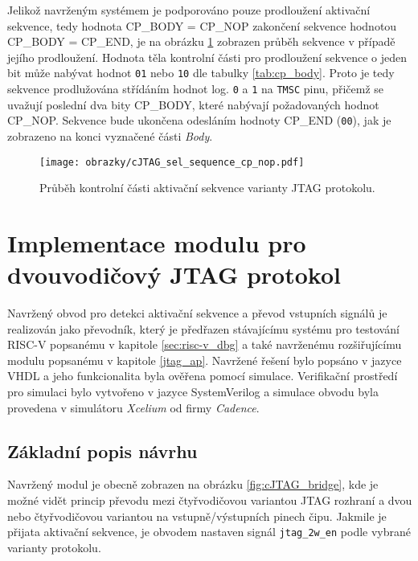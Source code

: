Jelikož navrženým systémem je podporováno pouze prodloužení aktivační sekvence, tedy hodnota CP\_BODY = CP\_NOP zakončení sekvence hodnotou \\CP\_BODY = CP\_END, je na obrázku \ref{fig:cJTAG_sel_cp_nop} zobrazen průběh sekvence v případě jejího prodloužení. Hodnota těla kontrolní části pro prodloužení sekvence o jeden bit může nabývat hodnot \texttt{01} nebo \texttt{10} dle tabulky \ref{tab:cp_body}. Proto je tedy sekvence prodlužována střídáním hodnot log. \texttt{0} a \texttt{1} na \texttt{\acs{TMSC}} pinu, přičemž se uvažují poslední dva bity CP\_BODY, které nabývají požadovaných hodnot CP\_NOP. Sekvence bude ukončena odesláním hodnoty CP\_END (\texttt{00}), jak je zobrazeno na konci vyznačené části \textit{Body}.

\begin{figure}[!h]
  \begin{center}
    \texttt{[image: obrazky/cJTAG\_sel\_sequence\_cp\_nop.pdf]}
  \end{center}
  \caption{Průběh kontrolní části aktivační sekvence varianty \acs{JTAG} protokolu.}
	\label{fig:cJTAG_sel_cp_nop}
\end{figure}

\section{Implementace modulu pro dvouvodičový \acs{JTAG} protokol}
Navržený obvod pro detekci aktivační sekvence a převod vstupních signálů je realizován jako převodník, který je předřazen stávajícímu systému pro testování \acs{RISC-V} popsanému v kapitole \ref{sec:risc-v_dbg} a také navrženému rozšiřujícímu modulu popsanému v kapitole \ref{jtag_ap}. Navržené řešení bylo popsáno v jazyce \acs{VHDL} a jeho funkcionalita byla ověřena pomocí simulace. Verifikační prostředí pro simulaci bylo vytvořeno v jazyce SystemVerilog a simulace obvodu byla provedena v simulátoru \textit{Xcelium} od firmy \textit{Cadence}.

\subsection{Základní popis návrhu}	\label{subsec:cJTAG_adapter}
Navržený modul je obecně zobrazen na obrázku \ref{fig:cJTAG_bridge}, kde je možné vidět princip převodu mezi čtyřvodičovou variantou \acs{JTAG} rozhraní a dvou nebo čtyřvodičovou variantou na vstupně/výstupních pinech čipu. Jakmile je přijata aktivační sekvence, je obvodem nastaven signál \texttt{jtag\_2w\_en} podle vybrané varianty protokolu.

